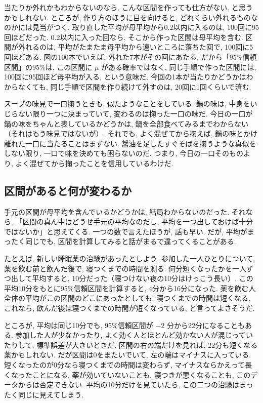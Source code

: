     当たりか外れかもわからないのなら, こんな区間を作っても仕方がない, と思うかもしれない.
    ところが, 作り方のほうに目を向けると, どれくらい外れるものなのかには見当がつく.
    取り直した平均が母平均から0.2以内に入るのは, 100回に95回ほどだった.
    0.2以内に入った回なら, そこから作った区間は母平均を含む.
    区間が外れるのは, 平均がたまたま母平均から遠いところに落ちた回で, 100回に5回ほどある.
    図の100本でいえば, 外れた7本がその回にあたる.
    だから「95\%信頼区間」の95\%は, この区間に $\mu$ がある確率ではなく, 同じ手順で作った区間には, 100回に95回ほど母平均が入る, という意味だ.
    今回の1本が当たりかどうかはわからなくても, 同じ手順で区間を作り続けて外すのは, 20回に1回くらいで済む.

    スープの味見で一口掬うときも, 似たようなことをしている.
    鍋の味は, 中身をいじらない限り一つに決まっていて, 変わるのは掬った一口の味だ.
    今日の一口が鍋の味をちゃんと表しているかどうかは, 鍋を全部食べてみるまでわからない（それはもう味見ではないが）.
    それでも, よく混ぜてから掬えば, 鍋の味とかけ離れた一口に当たることはまずない.
    醤油を足したすぐそばを掬うような真似をしない限り, 一口で味を決めても困らないのだ.
    つまり, 今日の一口そのものより, よく混ぜてから掬ったことを信用しているわけだ.

  \subsection{区間があると何が変わるか}

    手元の区間が母平均を含んでいるかどうかは, 結局わからないのだった.
    それなら, 「区間の真ん中はどうせ手元の平均なのだし, 平均を一つ出しておけば十分ではないか」と思えてくる.
    一つの数で言えたほうが, 話も早い.
    だが, 平均がまったく同じでも, 区間を計算してみると話がまるで違ってくることがある.

    たとえば, 新しい睡眠薬の治験があったとしよう.
    参加した一人ひとりについて, 薬を飲む前と飲んだ後で, 寝つくまでの時間を測る.
    何分短くなったかを一人ずつ出して平均すると, 10分だった（寝つけない夜の10分はけっこう長い）.
    この平均10分をもとに95\%信頼区間を計算すると, 4分から16分になった.
    薬を飲む人全体の平均がこの区間のどこにあったとしても, 寝つくまでの時間は短くなる.
    これなら, 飲んだ後は寝つくまでの時間が短くなっている, と言ってよさそうだ.

    ところが, 平均は同じ10分でも, 95\%信頼区間が $-2$ 分から22分になることもある.
    参加した人が少なかったり, よく効く人とほとんど効かない人が混じっていたりして, 標準誤差が大きいときだ.
    区間の右の端だけを見れば, 22分も短くなる薬かもしれない.
    だが区間は0をまたいでいて, 左の端はマイナスに入っている.
    短くなったのが0分なら寝つくまでの時間は変わらず, マイナスならかえって長くなったことになる.
    薬が効いていないことも, 寝つきが悪くなることも, このデータからは否定できない.
    平均の10分だけを見ていたら, この二つの治験はまったく同じに見えてしまう.

